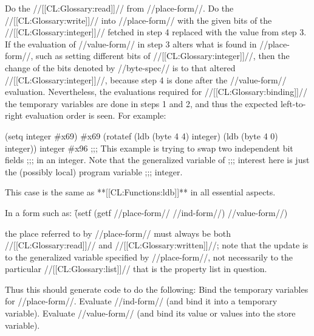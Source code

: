  Do the //[[CL:Glossary:read]]// from //place-form//.  Do the //[[CL:Glossary:write]]// into //place-form// with  the given bits of the //[[CL:Glossary:integer]]//
       fetched in step 4 replaced with the value from step 3. \endlist 
    If the evaluation of //value-form//  in step 3 alters what is found in //place-form//, such as setting different bits of //[[CL:Glossary:integer]]//,
    then the change of the bits denoted by  //byte-spec// is to that 
    altered //[[CL:Glossary:integer]]//,  because step 4 is done after the //value-form//
    evaluation.  Nevertheless, the 
    evaluations required for //[[CL:Glossary:binding]]//  the temporary variables are done in steps 1 and 
    2, and thus the expected left-to-right evaluation order is seen. For example:

\code
 (setq integer #x69) \EV #x69
 (rotatef (ldb (byte 4 4) integer) 
          (ldb (byte 4 0) integer))
 integer \EV #x96 ;;; This example is trying to swap two independent bit fields  ;;; in an integer.  Note that the generalized variable of  ;;; interest here is just the (possibly local) program variable ;;; integer. \endcode
 
   This case is the same as **[[CL:Functions:ldb]]** in all essential aspects.
 
    In a form such as:
  \f{(setf (getf //place-form// //ind-form//) //value-form//)}
 
    the place referred to by //place-form// must always be both //[[CL:Glossary:read]]//
    and //[[CL:Glossary:written]]//;  note that the update is to the generalized variable 
    specified by //place-form//, not necessarily to the particular  //[[CL:Glossary:list]]// that is the property list in question.
 
    Thus this  should generate code to do the following: \beginlist {}  Bind the temporary variables for //place-form//.   Evaluate //ind-form// (and bind it into a temporary variable).   Evaluate //value-form// (and bind   its value or values into the store variable).

